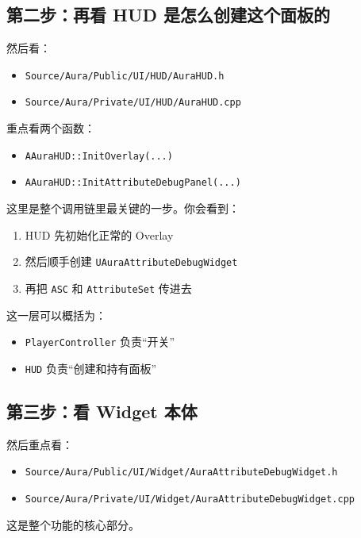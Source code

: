 \subsection{第二步：再看 HUD 是怎么创建这个面板的}
然后看：

\begin{itemize}
	\item \texttt{Source/Aura/Public/UI/HUD/AuraHUD.h}
	\item \texttt{Source/Aura/Private/UI/HUD/AuraHUD.cpp}
\end{itemize}

重点看两个函数：

\begin{itemize}
	\item \texttt{AAuraHUD::InitOverlay(...)}
	\item \texttt{AAuraHUD::InitAttributeDebugPanel(...)}
\end{itemize}

这里是整个调用链里最关键的一步。你会看到：

\begin{enumerate}
	\item HUD 先初始化正常的 Overlay
	\item 然后顺手创建 \texttt{UAuraAttributeDebugWidget}
	\item 再把 \texttt{ASC} 和 \texttt{AttributeSet} 传进去
\end{enumerate}

这一层可以概括为：

\begin{itemize}
	\item \texttt{PlayerController} 负责“开关”
	\item \texttt{HUD} 负责“创建和持有面板”
\end{itemize}

\subsection{第三步：看 Widget 本体}
然后重点看：
\begin{marker}
	\begin{itemize}
		\item \texttt{Source/Aura/Public/UI/Widget/AuraAttributeDebugWidget.h}
		\item \texttt{Source/Aura/Private/UI/Widget/AuraAttributeDebugWidget.cpp}
	\end{itemize}
\end{marker}
这是整个功能的核心部分。

